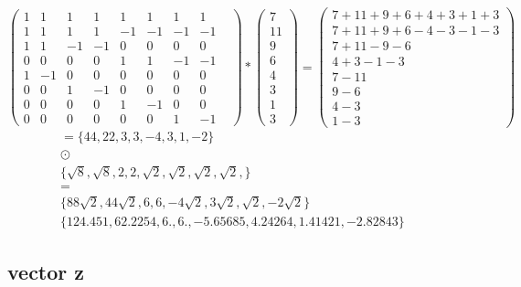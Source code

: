 \documentclass{article}
\begin{document}
\[ 
\begin{pmatrix} 
	1&1&1&1&1&1&1&1 \\ 
	1&1&1&1&-1&-1&-1&-1 \\
	1&1&-1&-1&0&0&0&0& \\ 
	0&0&0&0&1&1&-1&-1 \\ 
	1&-1&0&0&0&0&0&0& \\
	0&0&1&-1&0&0&0&0 \\ 
	0&0&0&0&1&-1&0&0& \\ 
	0&0&0&0&0&0&1&-1 
\end{pmatrix}
*
\begin{pmatrix}
  7 \\
  11 \\
  9 \\
  6 \\
  4 \\
  3 \\
  1 \\
  3 
\end{pmatrix}
=
\begin{pmatrix}
  7+11+9+6+4+3+1+3 \\
  7+11+9+6 -4 -3 -1 -3 \\
  7+11 -9-6 \\
  4+3 -1 -3 \\
  7-11 \\
  9-6 \\
  4-3 \\
  1-3

\end{pmatrix}
\]
\begin{align*}
	= \{ 44, 22, 3, 3, -4, 3, 1, -2 \} \\
	\odot&\\
\{ \sqrt{8}, \sqrt{8},2, 2, \sqrt{2}, \sqrt{2}, \sqrt{2}, \sqrt{2}, \} \\
    =&\\
	\{ 88 \sqrt{2}, 44 \sqrt{2}, 6, 6, -4 \sqrt{2}, 3 \sqrt{2}, \sqrt{2}, -2 \sqrt{2} \} \\
	\{ 124.451, 62.2254, 6., 6., -5.65685, 4.24264, 1.41421, -2.82843 \}
\end{align*}


\subsection{vector z}
\end{document}
